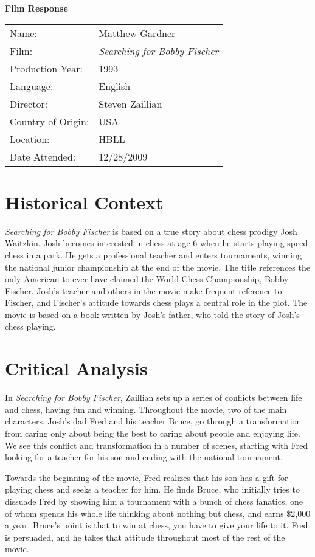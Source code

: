 \documentclass[onecolumn, 12pt]{article}
\title{}
\author{Matthew Gardner}
\date{}
\begin{document}
\textbf{Film Response}

\begin{tabular}{ll}
  Name:&Matthew Gardner \\
  Film:&\emph{Searching for Bobby Fischer}\\
  Production Year:&1993 \\
  Language:&English \\
  Director:&Steven Zaillian \\
  Country of Origin:&USA \\
  Location:&HBLL \\
  Date Attended:&12/28/2009 \\
\end{tabular}

\section*{Historical Context}

\emph{Searching for Bobby Fischer} is based on a true story about chess prodigy
Josh Waitzkin.  Josh becomes interested in chess at age 6 when he starts
playing speed chess in a park.  He gets a professional teacher and enters
tournaments, winning the national junior championship at the end of the movie.
The title references the only American to ever have claimed the World Chess
Championship, Bobby Fischer.  Josh's teacher and others in the movie make
frequent reference to Fischer, and Fischer's attitude towards chess plays a
central role in the plot.  The movie is based on a book written by Josh's
father, who told the story of Josh's chess playing.

\section*{Critical Analysis}

In \emph{Searching for Bobby Fischer}, Zaillian sets up a series of conflicts
between life and chess, having fun and winning.  Throughout the movie, two of
the main characters, Josh's dad Fred and his teacher Bruce, go through a 
transformation from caring only about being the best to caring about people and
enjoying life.  We see this conflict and transformation in a number of scenes,
starting with Fred looking for a teacher for his son and ending with the 
national tournament.

Towards the beginning of the movie, Fred realizes that his son has a gift for
playing chess and seeks a teacher for him.  He finds Bruce, who initially tries
to dissuade Fred by showing him a tournament with a bunch of chess fanatics,
one of whom spends his whole life thinking about nothing but chess, and earns
\$2,000 a year.  Bruce's point is that to win at chess, you have to give your
life to it.  Fred is persuaded, and he takes that attitude throughout most of
the rest of the movie.  
\end{document}
